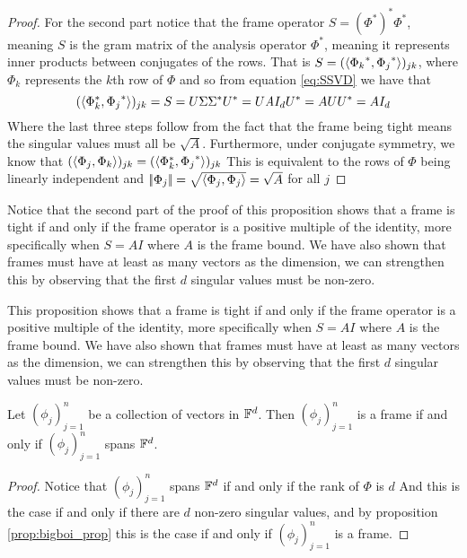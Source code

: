 {\begin{proof}
    For the second part notice that the frame operator $S=(\Phi^*)^*\Phi^*$, meaning $S$ is the gram matrix of the analysis operator $\Phi^*$, meaning it represents inner products between conjugates of the rows. That is $S=(\left\langle {\Phi_{k}}^*,{\Phi_j}^* \right\rangle)_{jk}$, where $\Phi_k$ represents the $k$th row of $\Phi$ and so from equation \ref{eq:SSVD} we have that
    $$%
    (\ip{{\Phi_{k}^*},{\Phi_j}^*})_{jk}=S=U\Sigma\Sigma^*U^*=U\textit{A}I_dU^*=AUU^*=AI_d$$ 
    Where the last three steps follow from the fact that the frame being tight means the singular values must all be $\sqrt{A}$. Furthermore, under conjugate symmetry, we know that $(\left\langle {\Phi_{j}},{\Phi_k} \right\rangle)_{jk}=
    (\left\langle {\Phi_{k}^*},{\Phi_j}^* \right\rangle)_{jk}$
    This is equivalent to the rows of $\Phi$ being linearly independent and $\norm{\Phi_j}=\sqrt{\ip{\Phi_j,\Phi_j}}=\sqrt{A}$ for all $j$
\end{proof}
Notice that the second part of the proof of this proposition shows that a frame is tight if and only if the frame operator is a positive multiple of the identity, more specifically when $S=AI$ where $A$ is the frame bound. We have also shown that frames must have at least as many vectors as the dimension, we can strengthen this by observing that the first $d$ singular values must be non-zero.
}{This proposition shows that a frame is tight if and only if the frame operator is a positive multiple of the identity, more specifically when $S=AI$ where $A$ is the frame bound. We have also shown that frames must have at least as many vectors as the dimension, we can strengthen this by observing that the first $d$ singular values must be non-zero.}
\begin{corollary}
\label{cor:frame_iff_span}
Let $(\phi_j)_{j=1}^n$ be a collection of vectors in $\mathbb{F}^d$. Then $(\phi_j)_{j=1}^n$ is a frame if and only if $(\phi_j)_{j=1}^n$ spans $\mathbb{F}^d$. 
\end{corollary}
\begin{proof}
    Notice that $(\phi_j)_{j=1}^n$ spans $\mathbb{F}^d$ if and only if the rank of $\Phi$ is $d$ And this is the case if and only if there are $d$ non-zero singular values, and by proposition \ref{prop:bigboi_prop} this is the case if and only if $(\phi_j)_{j=1}^n$ is a frame.
\end{proof}

